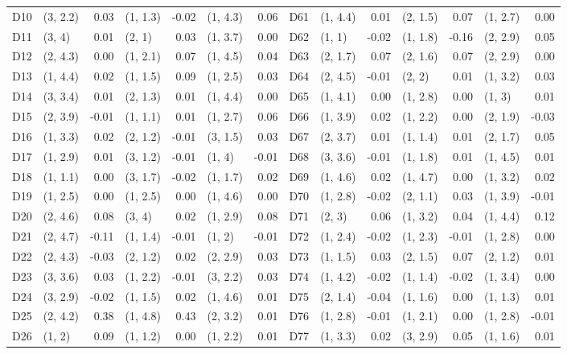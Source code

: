 \begin{table}[p]
\begin{tabular}{l|lr|lr|lr||l|lr|lr|lr}
D10 & (3, 2.2) & 0.03 & (1, 1.3) & -0.02 & (1, 4.3) & 0.06 & D61 & (1, 4.4) & 0.01 & (2, 1.5) & 0.07 & (1, 2.7) & 0.00 \\
D11 & (3, 4) & 0.01 & (2, 1) & 0.03 & (1, 3.7) & 0.00 & D62 & (1, 1) & -0.02 & (1, 1.8) & -0.16 & (2, 2.9) & 0.05 \\
D12 & (2, 4.3) & 0.00 & (1, 2.1) & 0.07 & (1, 4.5) & 0.04 & D63 & (2, 1.7) & 0.07 & (2, 1.6) & 0.07 & (2, 2.9) & 0.00 \\
D13 & (1, 4.4) & 0.02 & (1, 1.5) & 0.09 & (1, 2.5) & 0.03 & D64 & (2, 4.5) & -0.01 & (2, 2) & 0.01 & (1, 3.2) & 0.03 \\
D14 & (3, 3.4) & 0.01 & (2, 1.3) & 0.01 & (1, 4.4) & 0.00 & D65 & (1, 4.1) & 0.00 & (1, 2.8) & 0.00 & (1, 3) & 0.01 \\
D15 & (2, 3.9) & -0.01 & (1, 1.1) & 0.01 & (1, 2.7) & 0.06 & D66 & (1, 3.9) & 0.02 & (1, 2.2) & 0.00 & (2, 1.9) & -0.03 \\
D16 & (1, 3.3) & 0.02 & (2, 1.2) & -0.01 & (3, 1.5) & 0.03 & D67 & (2, 3.7) & 0.01 & (1, 1.4) & 0.01 & (2, 1.7) & 0.05 \\
D17 & (1, 2.9) & 0.01 & (3, 1.2) & -0.01 & (1, 4) & -0.01 & D68 & (3, 3.6) & -0.01 & (1, 1.8) & 0.01 & (1, 4.5) & 0.01 \\
D18 & (1, 1.1) & 0.00 & (3, 1.7) & -0.02 & (1, 1.7) & 0.02 & D69 & (1, 4.6) & 0.02 & (1, 4.7) & 0.00 & (1, 3.2) & 0.02 \\
D19 & (1, 2.5) & 0.00 & (1, 2.5) & 0.00 & (1, 4.6) & 0.00 & D70 & (1, 2.8) & -0.02 & (2, 1.1) & 0.03 & (1, 3.9) & -0.01 \\
D20 & (2, 4.6) & 0.08 & (3, 4) & 0.02 & (1, 2.9) & 0.08 & D71 & (2, 3) & 0.06 & (1, 3.2) & 0.04 & (1, 4.4) & 0.12 \\
D21 & (2, 4.7) & -0.11 & (1, 1.4) & -0.01 & (1, 2) & -0.01 & D72 & (1, 2.4) & -0.02 & (1, 2.3) & -0.01 & (1, 2.8) & 0.00 \\
D22 & (2, 4.3) & -0.03 & (2, 1.2) & 0.02 & (2, 2.9) & 0.03 & D73 & (1, 1.5) & 0.03 & (2, 1.5) & 0.07 & (2, 1.2) & 0.01 \\
D23 & (3, 3.6) & 0.03 & (1, 2.2) & -0.01 & (3, 2.2) & 0.03 & D74 & (1, 4.2) & -0.02 & (1, 1.4) & -0.02 & (1, 3.4) & 0.00 \\
D24 & (3, 2.9) & -0.02 & (1, 1.5) & 0.02 & (1, 4.6) & 0.01 & D75 & (2, 1.4) & -0.04 & (1, 1.6) & 0.00 & (1, 1.3) & 0.01 \\
D25 & (2, 4.2) & 0.38 & (1, 4.8) & 0.43 & (2, 3.2) & 0.01 & D76 & (1, 2.8) & -0.01 & (1, 2.1) & 0.00 & (1, 2.8) & -0.01 \\
D26 & (1, 2) & 0.09 & (1, 1.2) & 0.00 & (1, 2.2) & 0.01 & D77 & (1, 3.3) & 0.02 & (3, 2.9) & 0.05 & (1, 1.6) & 0.01 \\

\end{tabular}
\end{table}
